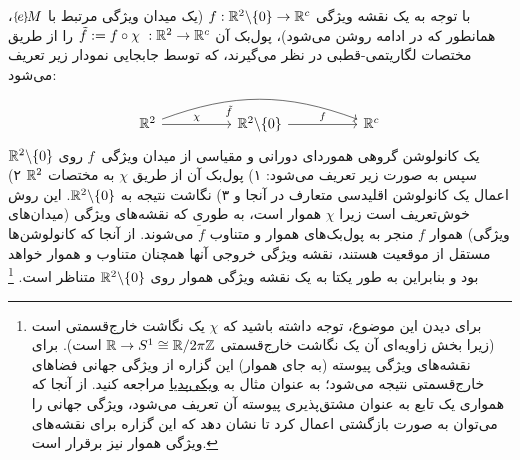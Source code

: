 با توجه به یک نقشه ویژگی $f: \mathbb{R}^2 \backslash \{0\} \to \mathbb{R}^c$ (یک میدان ویژگی مرتبط با $\eM$، همانطور که در ادامه روشن می‌شود)، \citet{esteves2017polar} پول‌بک آن $\tilde{f} := f \circ \chi \ : \mathbb{R}^2 \to \mathbb{R}^c$ را از طریق مختصات لگاریتمی-قطبی در نظر می‌گیرند، که توسط جابجایی نمودار زیر تعریف می‌شود:
\begin{equation}
	\begin{tikzcd}[row sep=2.5em, column sep=5.em]
		\R^2
		\arrow[r, "\chi"]
		\arrow[rr, bend left=20, "\tilde{f}"', pos=0.3]
		& \R^2 \backslash \{0\}
		\arrow[r, "f"]
		& \R^c
	\end{tikzcd}
\end{equation}
یک کانولوشن گروهی هموردای دورانی و مقیاسی از میدان ویژگی~$f$ روی $\mathbb{R}^2 \backslash \{0\}$ سپس به صورت زیر تعریف می‌شود:
۱) پول‌بک آن از طریق $\chi$ به مختصات $\mathbb{R}^2$
۲) اعمال یک کانولوشن اقلیدسی متعارف در آنجا و
۳) نگاشت نتیجه به $\mathbb{R}^2 \backslash \{0\}$.
این روش خوش‌تعریف است زیرا $\chi$ هموار است، به طوری که نقشه‌های ویژگی (میدان‌های ویژگی) هموار $f$ منجر به پول‌بک‌های هموار و متناوب $\tilde{f}$ می‌شوند.
از آنجا که کانولوشن‌ها مستقل از موقعیت هستند، نقشه ویژگی خروجی آنها همچنان متناوب و هموار خواهد بود و بنابراین به طور یکتا به یک نقشه ویژگی هموار روی $\mathbb{R}^2 \backslash \{0\}$ متناظر است.%
\footnote{
	برای دیدن این موضوع، توجه داشته باشید که $\chi$ یک نگاشت خارج‌قسمتی است (زیرا بخش زاویه‌ای آن یک نگاشت خارج‌قسمتی $\mathbb{R} \to S^1 \cong \mathbb{R}/2\pi\mathbb{Z}$ است).
	برای نقشه‌های ویژگی پیوسته (به جای هموار) این گزاره از ویژگی جهانی فضاهای خارج‌قسمتی نتیجه می‌شود؛ به عنوان مثال به 
	\href{https://en.wikipedia.org/wiki/Quotient_space_(topology)\#Properties}{\underline{ویکی‌پدیا}}
	مراجعه کنید.
	از آنجا که همواری یک تابع به عنوان مشتق‌پذیری پیوسته آن تعریف می‌شود، ویژگی جهانی را می‌توان به صورت بازگشتی اعمال کرد تا نشان دهد که این گزاره برای نقشه‌های ویژگی هموار نیز برقرار است.
}

